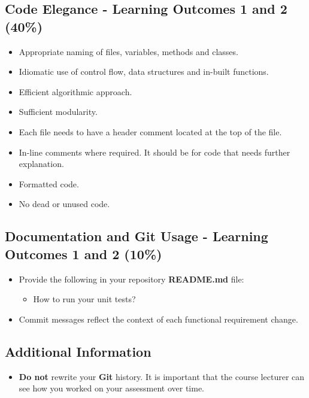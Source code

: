 \documentclass{article}
\begin{document}
\subsection*{Code Elegance - Learning Outcomes 1 and 2 (40\%)}
\begin{itemize}
    \item Appropriate naming of files, variables, methods and classes.
    \item Idiomatic use of control flow, data structures and in-built functions.
    \item Efficient algorithmic approach.
    \item Sufficient modularity.
    \item Each file needs to have a header comment located at the top of the file.
    \item In-line comments where required. It should be for code that needs further explanation.
    \item Formatted code.
    \item No dead or unused code.
\end{itemize}

\subsection*{Documentation and Git Usage - Learning Outcomes 1 and 2 (10\%)}
\begin{itemize}
    \item Provide the following in your repository \textbf{README.md} file:
    \begin{itemize}
        \item How to run your unit tests?
    \end{itemize}
    \item Commit messages reflect the context of each functional requirement change.
\end{itemize}

\subsection*{Additional Information}
\begin{itemize}
    \item \textbf{Do not} rewrite your \textbf{Git} history. It is important that the course lecturer can see how you worked on your assessment over time.
\end{itemize}
\end{document}
